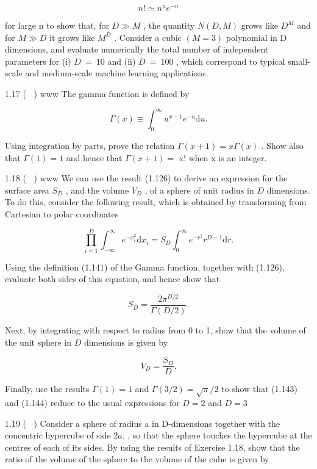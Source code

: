 \documentclass[
  10
]{article}
\begin{document}
\[
n! \simeq n ^ {n} e ^ {- n}\tag{1.140}
\]

for large n to show that, for \(D \gg M\) , the quantity \(N ( D , M )\)
grows like \(D ^ { M }\) and for \(M \gg D\) it grows like \(M ^ { D }\)
. Consider a cubic \(( M = 3 )\) polynomial in D dimensions, and
evaluate numerically the total number of independent parameters for (i)
\(D ~ = ~ 1 0\) and (ii) \(D ~ = ~ 1 0 0\) , which correspond to typical
small-scale and medium-scale machine learning applications.

1.17 ( ) www The gamma function is defined by

\[
\Gamma (x) \equiv \int_ {0} ^ {\infty} u ^ {x - 1} e ^ {- u} \mathrm{d} u.\tag{1.141}
\]

Using integration by parts, prove the relation
\(\Gamma ( x + 1 ) = x \Gamma ( x )\) . Show also that
\(\Gamma ( 1 ) = 1\) and hence that \(\Gamma ( x + 1 ) =\) x! when x is
an integer.

1.18 ( ) www We can use the result (1.126) to derive an expression for
the surface area \(S _ { D }\) , and the volume \(V _ { D }\) , of a
sphere of unit radius in \(D\) dimensions. To do this, consider the
following result, which is obtained by transforming from Cartesian to
polar coordinates

\[
\prod_ {i = 1} ^ {D} \int_ {- \infty} ^ {\infty} e ^ {- x _ {i} ^ {2}} \mathrm{d} x _ {i} = S _ {D} \int_ {0} ^ {\infty} e ^ {- r ^ {2}} r ^ {D - 1} \mathrm{d} r.\tag{1.142}
\]

Using the definition (1.141) of the Gamma function, together with
(1.126), evaluate both sides of this equation, and hence show that

\[
S _ {D} = \frac {2 \pi^ {D / 2}}{\Gamma (D / 2)}.\tag{1.143}
\]

Next, by integrating with respect to radius from 0 to 1, show that the
volume of the unit sphere in \(D\) dimensions is given by

\[
V _ {D} = \frac {S _ {D}}{D}.\tag{1.144}
\]

Finally, use the results \(\Gamma ( 1 ) = 1\) and
\(\Gamma ( 3 / 2 ) = \sqrt { \pi } / 2\) to show that (1.143) and
(1.144) reduce to the usual expressions for \(D = 2\) and \(D = 3\)

1.19 ( ) Consider a sphere of radius a in D-dimensions together with the
concentric hypercube of side \(2 a .\) , so that the sphere touches the
hypercube at the centres of each of its sides. By using the results of
Exercise 1.18, show that the ratio of the volume of the sphere to the
volume of the cube is given by
\end{document}
